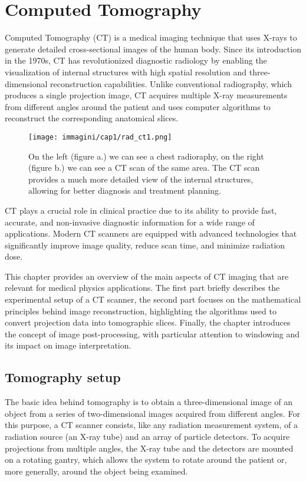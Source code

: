 \chapter{Computed Tomography}
Computed Tomography (CT) is a medical imaging technique that uses X-rays to generate detailed cross-sectional images of the human body. Since its introduction in the 1970s, CT has revolutionized diagnostic radiology by enabling the visualization of internal structures with high spatial resolution and three-dimensional reconstruction capabilities. Unlike conventional radiography, which produces a single projection image, CT acquires multiple X-ray measurements from different angles around the patient and uses computer algorithms to reconstruct the corresponding anatomical slices.

\begin{figure}[ht]
    \centering
    \texttt{[image: immagini/cap1/rad\_ct1.png]} 
    \caption{On the left (figure a.) we can see a chest radioraphy, on the right (figure b.) we can see a CT scan of the same area. The CT scan provides a much more detailed view of the internal structures, allowing for better diagnosis and treatment planning.}
    \label{fig:ct_scanner}
\end{figure}

CT plays a crucial role in clinical practice due to its ability to provide fast, accurate, and non-invasive diagnostic information for a wide range of applications. Modern CT scanners are equipped with advanced technologies that significantly improve image quality, reduce scan time, and minimize radiation dose.


This chapter provides an overview of the main aspects of CT imaging that are relevant for medical physics applications. The first part briefly describes the experimental setup of a CT scanner, the second part focuses on the mathematical principles behind image reconstruction, highlighting the algorithms used to convert projection data into tomographic slices. Finally, the chapter introduces the concept of image post-processing, with particular attention to windowing and its impact on image interpretation.

\section{Tomography setup}
The basic idea behind tomography is to obtain a three-dimensional image of an object from a series of two-dimensional images acquired from different angles.
For this purpose, a CT scanner consists, like any radiation measurement system, of a radiation source (an X-ray tube) and an array of particle detectors. To acquire projections from multiple angles, the X-ray tube and the detectors are mounted on a rotating gantry, which allows the system to rotate around the patient or, more generally, around the object being examined.

